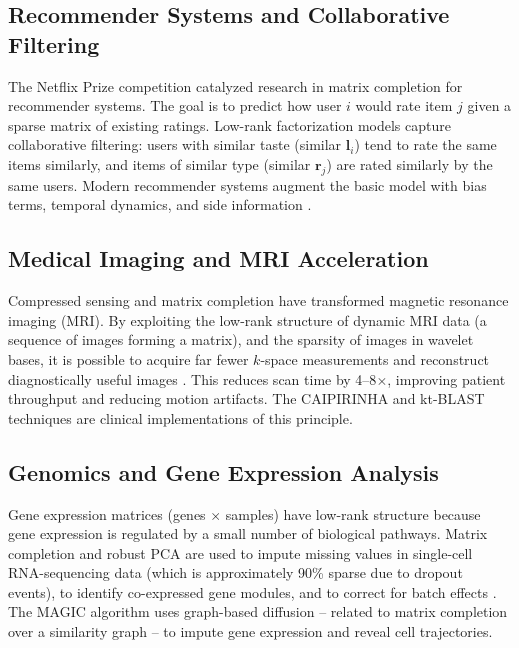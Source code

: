 \documentclass[conference]{IEEEtran}
\begin{document}
\subsection{Recommender Systems and Collaborative Filtering}

The Netflix Prize competition \cite{koren2009matrix,bell2007lessons} catalyzed research in matrix completion for recommender systems. The goal is to predict how user $i$ would rate item $j$ given a sparse matrix of existing ratings. Low-rank factorization models capture collaborative filtering: users with similar taste (similar $\mathbf{l}_i$) tend to rate the same items similarly, and items of similar type (similar $\mathbf{r}_j$) are rated similarly by the same users. Modern recommender systems augment the basic model with bias terms, temporal dynamics, and side information \cite{koren2009matrix}.

\subsection{Medical Imaging and MRI Acceleration}

Compressed sensing and matrix completion have transformed magnetic resonance imaging (MRI). By exploiting the low-rank structure of dynamic MRI data (a sequence of images forming a matrix), and the sparsity of images in wavelet bases, it is possible to acquire far fewer $k$-space measurements and reconstruct diagnostically useful images \cite{lustig2007sparse}. This reduces scan time by 4--8$\times$, improving patient throughput and reducing motion artifacts. The CAIPIRINHA and kt-BLAST techniques are clinical implementations of this principle.

\subsection{Genomics and Gene Expression Analysis}

Gene expression matrices (genes $\times$ samples) have low-rank structure because gene expression is regulated by a small number of biological pathways. Matrix completion and robust PCA are used to impute missing values in single-cell RNA-sequencing data (which is approximately 90\% sparse due to dropout events), to identify co-expressed gene modules, and to correct for batch effects \cite{troyanskaya2001missing}. The MAGIC algorithm uses graph-based diffusion -- related to matrix completion over a similarity graph -- to impute gene expression and reveal cell trajectories.
\end{document}
